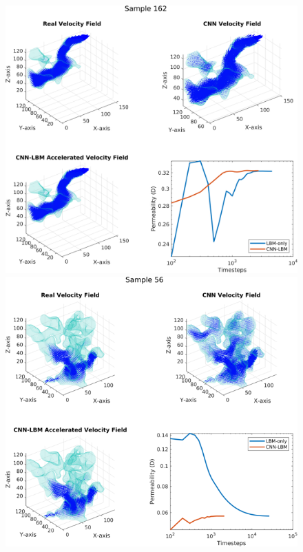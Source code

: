 \documentclass{article}
\begin{document}
\begin{figure}[htp!]
  \centering
  \begin{minipage}[b]{0.49\textwidth}
    \includegraphics[width=\textwidth]{figures/vel3DCompare162.png}
  \end{minipage}
  \hfill
  \begin{minipage}[b]{0.49\textwidth}
    \includegraphics[width=\textwidth]{figures/vel3DCompare56.png}

\end{minipage}
\end{figure}
\end{document}
